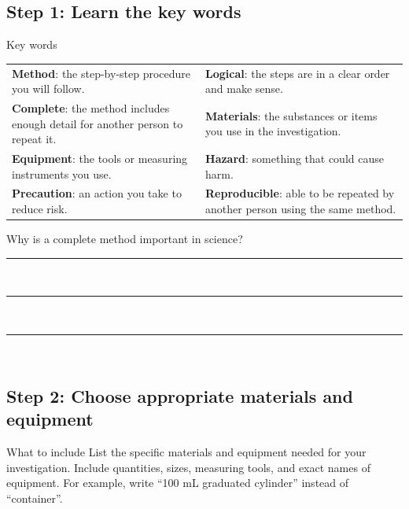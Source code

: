 \documentclass[12pt]{article}
\begin{document}
\newpage

\subsection*{Step 1: Learn the key words}

\begin{infobox}{Key words}

\begin{tabularx}{\textwidth}{X|X}

\textbf{Method}: the step-by-step procedure you will follow.
&
\textbf{Logical}: the steps are in a clear order and make sense.
\\[0.8em]

\textbf{Complete}: the method includes enough detail for another person to repeat it.
&
\textbf{Materials}: the substances or items you use in the investigation.
\\[0.8em]

\textbf{Equipment}: the tools or measuring instruments you use.
&
\textbf{Hazard}: something that could cause harm.
\\[0.8em]

\textbf{Precaution}: an action you take to reduce risk.
&
\textbf{Reproducible}: able to be repeated by another person using the same method.
\\

\end{tabularx}

\end{infobox}

\begin{studentbox}{}
Why is a complete method important in science?

\vspace{1em}
\rule{\textwidth}{0.4pt}\\[1.2em]
\rule{\textwidth}{0.4pt}\\[1.2em]
\rule{\textwidth}{0.4pt}\\[1.2em]
\end{studentbox}

\subsection*{Step 2: Choose appropriate materials and equipment}

\begin{infobox}{What to include}
List the specific materials and equipment needed for your investigation. Include quantities, sizes, measuring tools, and exact names of equipment. For example, write ``100 mL graduated cylinder'' instead of ``container''.
\end{infobox}
\end{document}
